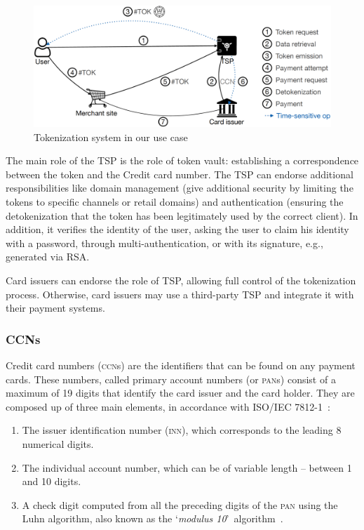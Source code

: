 \documentclass{llncs}
\begin{document}
\begin{figure}
    \centering
    \includegraphics[width=\textwidth]{figures/use_case.png}
    \caption{Tokenization system in our use case}
    \label{fig:tokenization-system}
\end{figure}

The main role of the TSP is the role of token vault: establishing a correspondence between the token and the Credit card number. The TSP can endorse additional responsibilities like domain management (give additional security by limiting the tokens to specific channels or retail domains) and authentication (ensuring the detokenization that the token has been legitimately used by the correct client). In addition, it verifies the identity of the user, asking the user to claim his identity with a password, through multi-authentication, or with its signature, e.g., generated via RSA.

Card issuers can endorse the role of TSP, allowing full control of the tokenization process. Otherwise, card issuers may use a third-party TSP and integrate it with their payment systems.

\subsubsection{CCNs}
Credit card numbers (\textsc{ccn}s) are the identifiers that can be found on any payment cards. These numbers, called primary account numbers (or \textsc{pan}s) consist of a maximum of 19 digits that identify the card issuer and the card holder. They are composed up of three main elements, in accordance with ISO/IEC 7812-1~\cite{ISO78121}:
\begin{enumerate}
    \item The issuer identification number (\textsc{inn}), which corresponds to the leading 8 numerical digits. 
    \item The individual account number, which can be of variable length -- between 1 and 10 digits.
    \item A check digit computed from all the preceding digits of the \textsc{pan} using the Luhn algorithm, also known as the \lq\textit{modulus 10}\rq~algorithm~\cite{Luhn1960}.
\end{enumerate}
\end{document}
